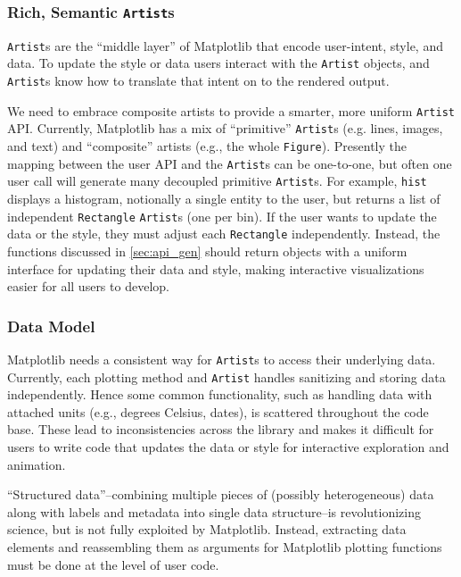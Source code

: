 \documentclass[11pt,letterpaper]{article}  %
\begin{document}
\subsubsection{Rich, Semantic \texttt{Artist}s}
\label{sec:artists}
\texttt{Artist}s are the ``middle layer'' of Matplotlib that encode
user-intent, style, and data.
To update the style or data users interact with the \texttt{Artist}
objects, and \texttt{Artist}s know how to
translate that intent on to the rendered output.

We need to embrace composite artists
to provide a smarter, more uniform \texttt{Artist} API.
Currently, Matplotlib has a mix of ``primitive'' \texttt{Artist}s
(e.g. lines, images, and text) and ``composite'' artists (e.g.,
the whole \texttt{Figure}).
Presently the mapping between the user API and the \texttt{Artist}s can be
one-to-one, but often one user call will generate many decoupled
primitive \texttt{Artist}s.
For example, \texttt{hist} displays a histogram, notionally a single entity to the user,
but returns a list of independent \texttt{Rectangle} \texttt{Artist}s
(one per bin).
If the user wants to update the data or the style,
they must adjust each \texttt{Rectangle} independently.
Instead, the
functions discussed in \ref{sec:api_gen} should return objects with
a uniform interface for updating their data and style, making
interactive visualizations easier for all users to develop.




\subsubsection{Data Model}
\label{sec:dm}

Matplotlib needs a consistent way for \texttt{Artist}s to access their
underlying data.
Currently, each plotting method and \texttt{Artist} handles sanitizing
and storing data independently.
Hence some common functionality, such as handling data with attached
units (e.g., degrees Celsius, dates), is scattered throughout the code
base.
These lead to inconsistencies across the library and makes it
difficult for users to write code that updates the data or style for interactive
exploration and animation.

``Structured data''--combining multiple pieces of (possibly
heterogeneous) data along with labels and metadata into single data
structure--is revolutionizing science, but is not fully exploited by
Matplotlib.
Instead, extracting
data elements and reassembling them as arguments for Matplotlib plotting
functions must be done at the level of user code.
\end{document}
